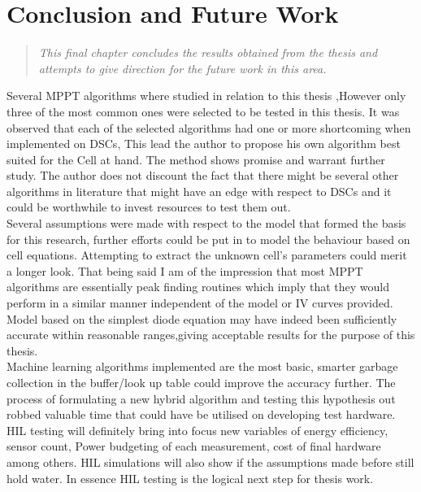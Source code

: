 \chapter{Conclusion and Future Work}
\begin{quote} 
\it This final chapter concludes the results obtained from the thesis and attempts to give direction for the future work in this area.
\end{quote}

Several \ac{MPPT} algorithms where studied in relation to this thesis ,However only three of the most common ones were selected to be tested in this thesis. It was observed that each of the selected algorithms had one or more shortcoming when implemented on \ac{DSCs}, This lead the author to propose his own algorithm best suited for the Cell at hand. The method shows promise and warrant further study. The author does not discount the fact that there might be several other algorithms in literature that might have an edge with respect to \ac{DSCs} and it could be worthwhile to invest resources to test them out.\\

Several assumptions were made with respect to the model that formed the basis for this research, further efforts could be put in to model the behaviour based on cell equations. Attempting to extract the unknown cell's parameters could merit a longer look. That being said I am of the impression that most \ac{MPPT} algorithms are essentially peak finding routines which imply that they would perform in a similar manner independent of the model or IV curves provided. Model based on the simplest diode equation may have indeed been sufficiently accurate within reasonable ranges,giving acceptable results for the purpose of this thesis.\\

Machine learning algorithms implemented are the most basic, smarter garbage collection in the buffer/look up table could improve the accuracy further. The process of formulating a new hybrid algorithm and testing this hypothesis out robbed valuable time that could have be utilised on developing test hardware. \ac{HIL} testing will definitely bring into focus new variables of energy efficiency, sensor count, Power budgeting of each measurement, cost of final hardware among others. \ac{HIL} simulations will also show if the assumptions made before still hold water. In essence \ac{HIL} testing is the logical next step for thesis work.\\

